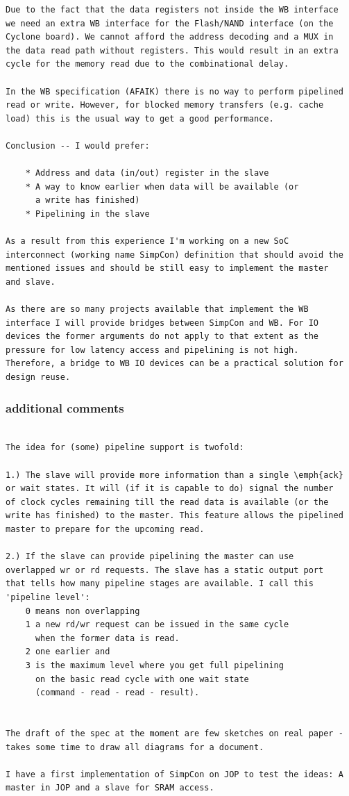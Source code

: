 \documentclass[a4paper,12pt]{scrartcl}
\begin{document}
\begin{verbatim}
Due to the fact that the data registers not inside the WB interface
we need an extra WB interface for the Flash/NAND interface (on the
Cyclone board). We cannot afford the address decoding and a MUX in
the data read path without registers. This would result in an extra
cycle for the memory read due to the combinational delay.

In the WB specification (AFAIK) there is no way to perform pipelined
read or write. However, for blocked memory transfers (e.g. cache
load) this is the usual way to get a good performance.

Conclusion -- I would prefer:

    * Address and data (in/out) register in the slave
    * A way to know earlier when data will be available (or
      a write has finished)
    * Pipelining in the slave

As a result from this experience I'm working on a new SoC
interconnect (working name SimpCon) definition that should avoid the
mentioned issues and should be still easy to implement the master
and slave.

As there are so many projects available that implement the WB
interface I will provide bridges between SimpCon and WB. For IO
devices the former arguments do not apply to that extent as the
pressure for low latency access and pipelining is not high.
Therefore, a bridge to WB IO devices can be a practical solution for
design reuse.
\end{verbatim}

\subsubsection{additional comments}
\begin{verbatim}

The idea for (some) pipeline support is twofold:

1.) The slave will provide more information than a single \emph{ack}
or wait states. It will (if it is capable to do) signal the number
of clock cycles remaining till the read data is available (or the
write has finished) to the master. This feature allows the pipelined
master to prepare for the upcoming read.

2.) If the slave can provide pipelining the master can use
overlapped wr or rd requests. The slave has a static output port
that tells how many pipeline stages are available. I call this
'pipeline level':
    0 means non overlapping
    1 a new rd/wr request can be issued in the same cycle
      when the former data is read.
    2 one earlier and
    3 is the maximum level where you get full pipelining
      on the basic read cycle with one wait state
      (command - read - read - result).


The draft of the spec at the moment are few sketches on real paper -
takes some time to draw all diagrams for a document.

I have a first implementation of SimpCon on JOP to test the ideas: A
master in JOP and a slave for SRAM access.
\end{verbatim}
\end{document}
